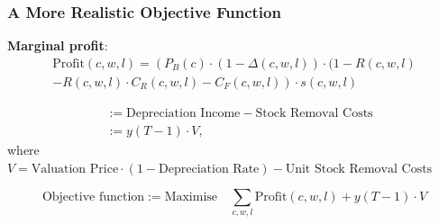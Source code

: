 \documentclass[xcolor=table]{beamer}
\begin{document}
\begin{frame}[t]
  \frametitle{A More Realistic Objective Function}
{\small
\textcolor{orange2}{\textbf{Marginal profit}}:
\begin{multline*}
  \text{Profit}(c, w, l) =  \left ( P_B(c) \cdot (1 - \Delta(c, w, l)) \cdot (1 - R(c, w, l) \right . \\ 
                    - \left . R(c, w, l) \cdot C_R(c, w, l)  - C_F(c, w, l)
                    \right ) \cdot s(c, w, l)
\end{multline*}

\pause

\begin{align*}
   & := \text{Depreciation Income} - \text{Stock Removal Costs} \\
   & := y(T - 1) \cdot V,
\end{align*}
where $V = \text{Valuation Price} \cdot (1 - \text{Depreciation Rate}) -
  \text{Unit Stock Removal Costs}$
  }
\pause

\begin{equation*}
  \text{Objective function} := \text{Maximise} \quad \sum_{c, w, l}
  \text{Profit}(c, w, l) + y(T - 1) \cdot V 
\end{equation*}
\end{frame}
\end{document}
